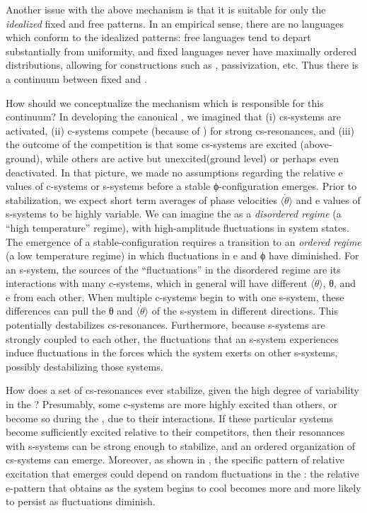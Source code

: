   Another issue with the above mechanism is that it is suitable for only the \textit{idealized} fixed and free  patterns. In an empirical sense, there are no languages which conform to the idealized patterns: free  languages tend to depart substantially from uniformity, and fixed  languages never have maximally ordered distributions, allowing for constructions such as , passivization, etc. Thus there is a continuum between fixed and . 

  How should we conceptualize the mechanism which is responsible for this continuum? In developing the canonical , we imagined that (i) cs-systems are activated, (ii) c-systems compete (because of ) for strong cs-resonances, and (iii) the outcome of the competition is that some cs-systems are excited (above-ground), while others are active but unexcited\linebreak (ground level) or perhaps even deactivated. In that picture, we made no assumptions regarding the relative e values of c-systems or s-systems before a stable ϕ-con\-fig\-u\-ra\-tion emerges. Prior to stabilization, we expect short term averages of phase velocities $\langle\dot{\theta}\rangle$ and e values of s-systems to be highly variable. We can imagine the  as a \textit{disordered regime} (a “high temperature” regime), with high-amplitude fluctuations in system states. The emergence of a stable-con\-fig\-u\-ra\-tion requires a transition to an \textit{ordered regime} (a low temperature regime) in which fluctuations in e and ϕ have diminished. For an s-system, the sources of the “fluctuations” in the disordered regime are its interactions with many c-systems, which in general will have different $\langle\dot{\theta}\rangle$, θ, and e from each other. When multiple c-systems begin to  with one s-system, these differences can pull the θ and $\langle\dot{\theta}\rangle$ of the s-system in different directions. This  potentially destabilizes cs-resonances. Furthermore, because s-systems are strongly coupled to each other, the fluctuations that an s-system experiences induce fluctuations in the forces which the system exerts on other s-systems, possibly destabilizing those systems.

  How does a set of cs-resonances ever stabilize, given the high degree of variability in the ? Presumably, some c-systems are more highly excited than others, or become so during the , due to their  interactions. If these particular systems become sufficiently excited relative to their competitors, then their resonances with s-systems can be strong enough to stabilize, and an ordered organization of cs-systems can emerge. Moreover, as shown in {}, the specific pattern of relative excitation that emerges could depend on random fluctuations in the : the relative e-pattern that obtains as the system begins to cool becomes more and more likely to persist as fluctuations diminish.


